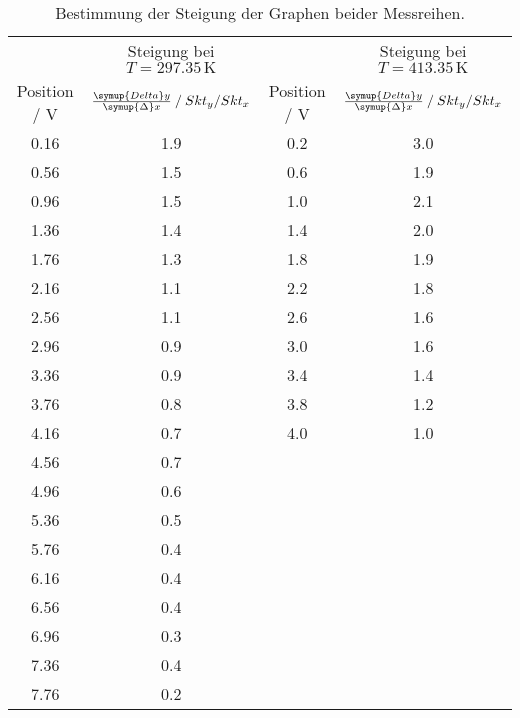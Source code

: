 \begin{table}
    \centering
    \caption{Bestimmung der Steigung der Graphen beider Messreihen.}
\begin{tabular}{c c c c}
    \toprule
    & Steigung bei $T=297.35\,\unit{\kelvin}$ & & Steigung bei  $T=413.35\,\unit{\kelvin}$ \\
        Position / V & $\frac{\symup{Delta}y}{\symup{\Delta}x} \mathbin{/} Skt_y/Skt_x$ &Position / V & $\frac{\symup{Delta}y}{\symup{\Delta}x} \mathbin{/} Skt_y/Skt_x$ \\
    \midrule
    0.16 & 1.9 & 0.2 & 3.0 \\
    0.56 & 1.5 & 0.6 & 1.9 \\
    0.96 & 1.5 & 1.0 & 2.1 \\
    1.36 & 1.4 & 1.4 & 2.0 \\
    1.76 & 1.3 & 1.8 & 1.9 \\
    2.16 & 1.1 & 2.2 & 1.8 \\ 
    2.56 & 1.1 & 2.6 & 1.6 \\
    2.96 & 0.9 & 3.0 & 1.6 \\
    3.36 & 0.9 & 3.4 & 1.4 \\
    3.76 & 0.8 & 3.8 & 1.2 \\
    4.16 & 0.7 & 4.0 & 1.0 \\
    4.56 & 0.7 & &&\\
    4.96 & 0.6 & &&\\
    5.36 & 0.5 & &&\\
    5.76 & 0.4 & &&\\
    6.16 & 0.4 & &&\\
    6.56 & 0.4 & &&\\
    6.96 & 0.3 & &&\\
    7.36 & 0.4 & &&\\
    7.76 & 0.2 & &&\\
     \bottomrule
    \end{tabular}
    \label{tab: steigung}
\end{table}

